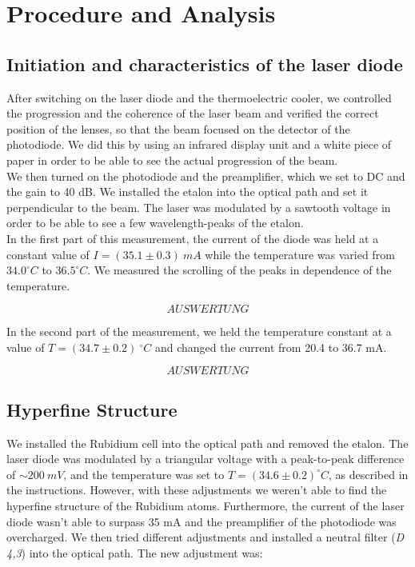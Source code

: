 \section{Procedure and Analysis}

\subsection{Initiation and characteristics of the laser diode}

After switching on the laser diode and the thermoelectric cooler, we controlled the progression and the coherence of the laser beam and verified the correct position of the lenses, so that the beam focused on the detector of the photodiode. We did this by using an infrared display unit and a white piece of paper in order to be able to see the actual progression of the beam.\\

We then turned on the photodiode and the preamplifier, which we set to DC and the gain to 40 dB. We installed the etalon into the optical path and set it perpendicular to the beam. The laser was modulated by a sawtooth voltage in order to be able to see a few wavelength-peaks of the etalon.\\

In the first part of this measurement, the current of the diode was held at a constant value of $I = (35.1\pm 0.3)\ mA$ while the temperature was varied from $34.0^\circ C$ to $36.5^\circ C$. We measured the scrolling of the peaks in dependence of the temperature.

$$ AUSWERTUNG $$

In the second part of the measurement, we held the temperature constant at a value of $T=(34.7 \pm 0.2)\ ^\circ C$ and changed the current from 20.4 to 36.7 mA.

$$ AUSWERTUNG $$

\subsection{Hyperfine Structure}

We installed the Rubidium cell into the optical path and removed the etalon. The laser diode was modulated by a triangular voltage with a peak-to-peak difference of $\sim 200\ mV$, and the temperature was set to $T = (34.6 \pm 0.2)^\circ C$, as described in the instructions. However, with these adjustments we weren't able to find the hyperfine structure of the Rubidium atoms. Furthermore, the current of the laser diode wasn't able to surpass 35 mA and the preamplifier of the photodiode  was overcharged. We then tried different adjustments and installed a neutral filter (\emph{D 4,3}) into the optical path. The new adjustment was:\\

